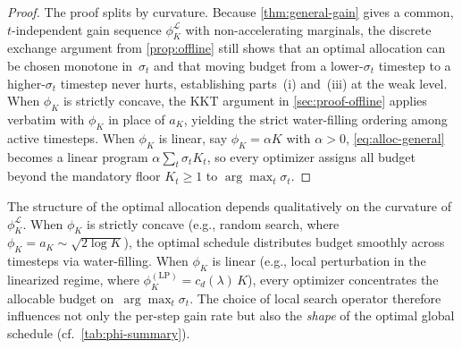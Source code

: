 \begin{proof}
The proof splits by curvature.
Because \cref{thm:general-gain} gives a common, $t$-independent gain
sequence $\phi_K^{\mathcal{L}}$ with non-accelerating marginals, the
discrete exchange argument from \cref{prop:offline} still shows that an
optimal allocation can be chosen monotone in~$\sigma_t$ and that moving
budget from a lower-$\sigma_t$ timestep to a higher-$\sigma_t$ timestep
never hurts, establishing parts~(i) and~(iii) at the weak level.
When $\phi_K$ is strictly concave, the KKT argument in
\cref{sec:proof-offline} applies verbatim with $\phi_K$ in place of $a_K$,
yielding the strict water-filling ordering among active timesteps.
When $\phi_K$ is linear, say $\phi_K=\alpha K$ with $\alpha>0$,
\eqref{eq:alloc-general} becomes a linear program
$\alpha\sum_t \sigma_t K_t$, so every optimizer assigns all budget beyond
the mandatory floor $K_t\ge 1$ to $\arg\max_t \sigma_t$.
\end{proof}

\begin{remark}
\label{rmk:curvature}
The structure of the optimal allocation depends qualitatively on the
curvature of~$\phi_K^{\mathcal{L}}$.
When $\phi_K$ is strictly concave (e.g., random search, where
$\phi_K = a_K \sim \sqrt{2\log K}$), the optimal schedule
distributes budget smoothly across timesteps via water-filling.
When $\phi_K$ is linear (e.g., local perturbation in the linearized
regime, where $\phi_K^{(\mathrm{LP})} = c_d(\lambda)\,K$), every
optimizer concentrates the allocable budget on~$\arg\max_t \sigma_t$.
The choice of local search operator therefore influences not only the
per-step gain rate but also the \emph{shape} of the optimal global schedule
(cf.\ \cref{tab:phi-summary}).
\end{remark}

